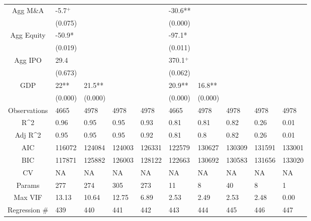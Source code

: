 \documentclass{article}
\begin{document}
\begin{table}[H]
\begin{tabular}{|clllllllll|}
  Agg M\&A & -5.7$^{+}$ &  &  &  & -30.6** &  &  &  &  \\ 
   & (0.075) &  &  &  & (0.000) &  &  &  &  \\ 
  Agg Equity & -50.9* &  &  &  & -97.1* &  &  &  &  \\ 
   & (0.019) &  &  &  & (0.011) &  &  &  &  \\ 
  Agg IPO & 29.4 &  &  &  & 370.1$^{+}$ &  &  &  &  \\ 
   & (0.673) &  &  &  & (0.062) &  &  &  &  \\ 
  GDP & 22** & 21.5** &  &  & 20.9** & 16.8** &  &  &  \\ 
   & (0.000) & (0.000) &  &  & (0.000) & (0.000) &  &  &  \\ 
  \hline 
 Observations & 4665 & 4978 & 4978 & 4978 & 4665 & 4978 & 4978 & 4978 & 4978 \\ 
  R^2 & 0.96 & 0.95 & 0.95 & 0.93 & 0.81 & 0.81 & 0.82 & 0.26 & 0.01 \\ 
  Adj R^2 & 0.95 & 0.95 & 0.95 & 0.92 & 0.81 & 0.8 & 0.82 & 0.26 & 0.01 \\ 
  AIC & 116072 & 124084 & 124003 & 126331 & 122579 & 130627 & 130309 & 131591 & 133001 \\ 
  BIC & 117871 & 125882 & 126003 & 128122 & 122663 & 130692 & 130583 & 131656 & 133020 \\ 
  CV & NA & NA & NA & NA & NA & NA & NA & NA & NA \\ 
  Params & 277 & 274 & 305 & 273 & 11 & 8 & 40 & 8 & 1 \\ 
  Max VIF & 13.13 & 10.64 & 12.75 & 6.89 & 2.53 & 2.49 & 2.53 & 2.48 & 0.00 \\ 
  Regression \# & 439 & 440 & 441 & 442 & 443 & 444 & 445 & 446 & 447 \\ 
   \hline
\end{tabular}
 
\end{table}
\end{document}
